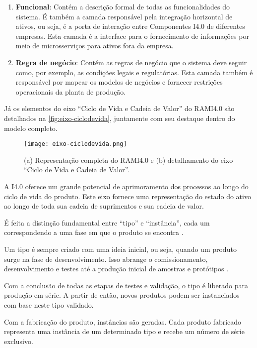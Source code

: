 \begin{enumerate}
	\item \textbf{Funcional}: Contém a descrição formal de todas as funcionalidades do sistema. É também a camada responsável pela integração horizontal de ativos, ou seja, é a porta de interação entre Componentes I4.0 de diferentes empresas. Esta camada é a interface para o fornecimento de informações por meio de microsserviços para ativos fora da empresa.

	\item \textbf{Regra de negócio}: Contém as regras de negócio que o sistema deve seguir como, por exemplo, as condições legais e regulatórias. Esta camada também é responsável por mapear os modelos de negócios e fornecer restrições operacionais da planta de produção.
\end{enumerate}

Já os elementos do eixo ``Ciclo de Vida e Cadeia de Valor'' do RAMI4.0 são detalhados na \autoref{fig:eixo-ciclodevida}, juntamente com seu destaque dentro do modelo completo.

\begin{figure}[htb]
	\centering
	\texttt{[image: eixo-ciclodevida.png]}
	\caption{(a) Representação completa do RAMI4.0 e (b) detalhamento do eixo ``Ciclo de Vida e Cadeia de Valor''.}
	\label{fig:eixo-ciclodevida}
\end{figure}

A I4.0 oferece um grande potencial de aprimoramento dos processos ao longo do ciclo de vida do produto. Este eixo fornece uma representação do estado do ativo ao longo de toda sua cadeia de suprimentos e sua cadeia de valor.

É feita a distinção fundamental entre ``tipo'' e ``instância'', cada um correspondendo a uma fase em que o produto se encontra \cite{adolphs2015rami}.

Um tipo é sempre criado com uma ideia inicial, ou seja, quando um produto surge na fase de desenvolvimento. Isso abrange o comissionamento, desenvolvimento e testes até a produção inicial de amostras e protótipos \cite{adolph2018roadmap}.

Com a conclusão de todas as etapas de testes e validação, o tipo é liberado para produção em série. A partir de então, novos produtos podem ser instanciados com base neste tipo validado.

Com a fabricação do produto, instâncias são geradas. Cada produto fabricado representa uma instância de um determinado tipo e recebe um número de série exclusivo.

